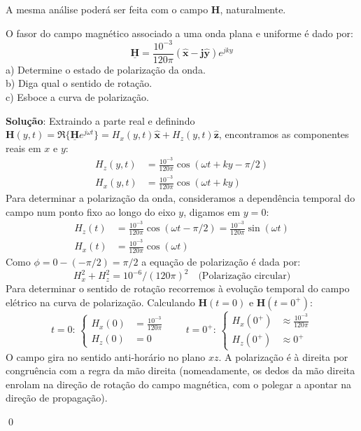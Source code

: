 A mesma análise poderá ser feita com o campo $\mathbf{H}$, naturalmente.

\vfill
\begin{question}
    O fasor do campo magnético associado a uma onda plana e uniforme é dado por:
    $$
        \mathbf{\underline{H}} = \frac{10^{-3}}{120\pi}\left(\mathbf{\hat{x} - j\mathbf{\hat{y}}}\right)e^{jky}
    $$
    a) Determine o estado de polarização da onda.\\[3pt]
    b) Diga qual o sentido de rotação.\\[3pt]
    c) Esboce a curva de polarização.

    \questionSep
    \textbf{Solução}: Extraindo a parte real e definindo $\mathbf{H}(y,t) = \Re\{\mathbf{\underline{H}} e^{j\omega t}\} = H_x(y,t) \mathbf{\hat{x}} + H_z(y,t) \mathbf{\hat{z}}$, encontramos as componentes reais em $x$ e $y$:
    \begin{equation}
        \begin{aligned}
            H_z(y,t) &= \frac{10^{-3}}{120\pi} \cos\left(\omega t + ky -\pi/2\right)\\[1pt]
            H_x(y,t) &= \frac{10^{-3}}{120\pi} \cos(\omega t + ky)
        \end{aligned}
    \end{equation}
    Para determinar a polarização da onda, consideramos a dependência temporal do campo num ponto fixo ao longo do eixo $y$, digamos em $y = 0$:
    \begin{equation}
        \begin{aligned}
            H_z(t) &= \frac{10^{-3}}{120\pi} \cos\left(\omega t -\pi/2\right) = \frac{10^{-3}}{120\pi}\sin(\omega t)\\[1pt]
            H_x(t) &= \frac{10^{-3}}{120\pi} \cos(\omega t)
        \end{aligned}
    \end{equation}
    Como $\phi = 0 - (-\pi/2) = \pi/2$ a equação de polarização é dada por:
    $$
       H_{x}^2 + H_{z}^2 = 10^{-6}/(120\pi)^2\quad \text{(Polarização circular)}
    $$
    Para determinar o sentido de rotação recorremos à evolução temporal do campo elétrico na curva de polarização. Calculando $\mathbf{H}(t=0)$ e $\mathbf{H}(t=0^+)$:
    \begin{equation*}
        t = 0: \, \left\{
        \begin{aligned}
            H_{x}(0) &= \frac{10^{-3}}{120\pi}\\[1pt]
            H_{z}(0) &= 0
        \end{aligned}\right.
        \qquad
        t = 0^+: \, \left\{
        \begin{aligned}
            H_{x}(0^+) &\approx \frac{10^{-3}}{120\pi}\\[1pt]
            H_{z}(0^+) &\approx 0^+
        \end{aligned}\right.
    \end{equation*}
    O campo gira no sentido anti-horário no plano $xz$. A polarização é à direita por congruência com a regra da mão direita (nomeadamente, os dedos da mão direita enrolam na direção de rotação do campo magnética, com o polegar a apontar na direção de propagação).
    
    \qed
\end{question}
